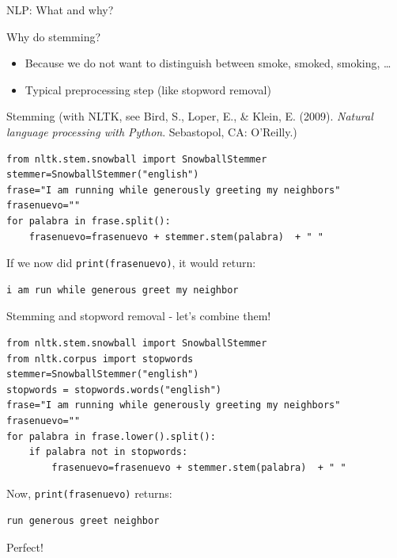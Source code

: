 \documentclass{beamer}
\begin{document}
\begin{frame}{NLP: What and why?}
\begin{block}{Why do stemming?}
\begin{itemize}
\item Because we do not want to distinguish between smoke, smoked, smoking, \ldots
\item Typical preprocessing step (like stopword removal)
\end{itemize}
\end{block}
\end{frame}

\begin{frame}[fragile]{Stemming}
{\footnotesize{(with NLTK, see Bird, S., Loper, E., \& Klein, E. (2009). \emph{Natural language processing with Python}. Sebastopol, CA: O’Reilly.)}}
\begin{lstlisting}
from nltk.stem.snowball import SnowballStemmer
stemmer=SnowballStemmer("english")
frase="I am running while generously greeting my neighbors"
frasenuevo=""
for palabra in frase.split():
    frasenuevo=frasenuevo + stemmer.stem(palabra)  + " "
\end{lstlisting}
If we now did {\tt{print(frasenuevo)}}, it would return:
\begin{lstlisting}
i am run while generous greet my neighbor
\end{lstlisting}
\end{frame}

\begin{frame}[fragile]{Stemming and stopword removal - let's combine them!}
\begin{lstlisting}
from nltk.stem.snowball import SnowballStemmer
from nltk.corpus import stopwords
stemmer=SnowballStemmer("english")
stopwords = stopwords.words("english")
frase="I am running while generously greeting my neighbors"
frasenuevo=""
for palabra in frase.lower().split():
    if palabra not in stopwords:
        frasenuevo=frasenuevo + stemmer.stem(palabra)  + " "
\end{lstlisting}
Now, {\tt{print(frasenuevo)}} returns:
\begin{lstlisting}
run generous greet neighbor
\end{lstlisting}
Perfect!\\
\end{frame}
\end{document}
